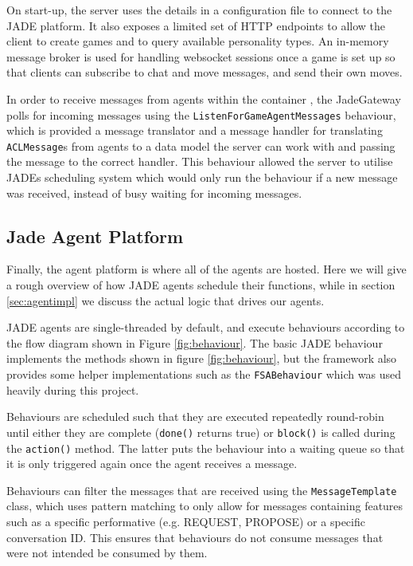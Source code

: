 \documentclass{article}
\begin{document}
On start-up, the server uses the details in a configuration file to connect to the JADE platform. It also exposes a limited set of HTTP endpoints to allow the client to create games and to query available personality types. An in-memory message broker is used for handling websocket sessions once a game is set up so that clients can subscribe to chat and move messages, and send their own moves. 

In order to receive messages from agents within the container , the JadeGateway polls for incoming messages using the \lstinline{ListenForGameAgentMessages} behaviour, which is provided a message translator and a message handler for translating \lstinline{ACLMessage}s from agents to a data model the server can work with and passing the message to the correct handler. This behaviour allowed the server to utilise JADEs scheduling system which would only run the behaviour if a new message was received, instead of busy waiting for incoming messages. 

\subsection{Jade Agent Platform}

Finally, the agent platform is where all of the agents are hosted. Here we will give a rough overview of how JADE agents schedule their functions, while in section \ref{sec:agentimpl} we discuss the actual logic that drives our agents.

JADE agents are single-threaded by default, and execute behaviours according to the flow diagram shown in Figure \ref{fig:behaviour}. The basic JADE behaviour implements the methods shown in figure \ref{fig:behaviour}, but the framework also provides some helper implementations such as the \lstinline{FSABehaviour} which was used heavily during this project. 

Behaviours are scheduled such that they are executed repeatedly round-robin until either they are complete (\lstinline{done()} returns true) or \lstinline{block()} is called during the \lstinline{action()} method. The latter puts the behaviour into a waiting queue so that it is only triggered again once the agent receives a message. 

Behaviours can filter the messages that are received using the \lstinline{MessageTemplate} class, which uses pattern matching to only allow for messages containing features such as a specific performative (e.g. REQUEST, PROPOSE) or a specific conversation ID. This ensures that behaviours do not consume messages that were not intended be consumed by them. 
\end{document}
